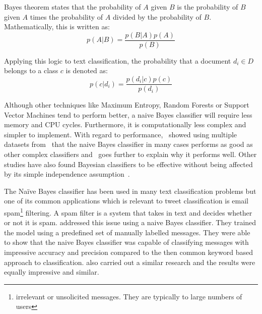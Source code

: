 Bayes theorem states that the probability of $A$ given $B$ is the probability of $B$ given $A$ times
the probability of $A$ divided by the probability of $B$. Mathematically, this is written as:
\begin{equation}
  p(A|B) = \frac{p(B|A)p(A)}{p(B)}
\end{equation}

Applying this logic to text classification, the probability that a document $d_i \in D$ belongs to a
class $c$ is denoted as:
\begin{equation}
  p(c|d_i) = \frac{p(d_i|c)p(c)}{p(d_i)}
\end{equation}

Although other techniques like Maximum Entropy, Random Forests or Support Vector Machines tend to
perform better, a naive Bayes classifier will require less memory and CPU cycles. Furthermore, it is
computationally less complex and simpler to implement. With regard to
performance,~\cite{huangLuLing2003} showed using multiple datasets from~\cite{blakeMerz1998} that
the naive Bayes classifier in many cases performs as good as other complex classifiers
and~\cite{zhang2004} goes further to explain why it performs well. Other studies have also found
Bayesian classifiers to be effective without being affected by its simple independence
assumption~\cite{langley1992analysis,manning2008}.

The Na\"{i}ve Bayes classifier has been used in many text classification problems but one of its
common applications which is relevant to tweet classification is email spam\footnote{irrelevant or
unsolicited messages. They are typically to large numbers of users} filtering. A spam
filter is a system that takes in text and decides whether or not it is
spam. \cite{androutsopoulos2000learning} addressed this issue using a naive Bayes classifier. They
trained the model using a predefined set of manually labelled messages. They were able to show that
the naive Bayes classifier was capable of classifying messages with impressive accuracy and precision
compared to the then common keyword based approach to classification. \cite{deshpande2007evaluation}
also carried out a similar research and the results were equally impressive and similar.

